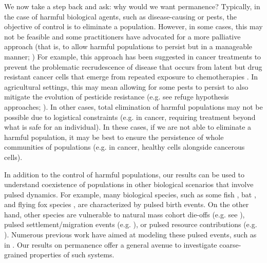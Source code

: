 \documentclass{article}
\theoremstyle{definition}
\begin{document}
We now take a step back and ask: why would we want permanence?  Typically, in the case of harmful biological agents, such as disease-causing or pests, the objective of control is to eliminate a population. However, in some cases, this may not be feasible and some practitioners have advocated for a more palliative approach (that is, to allow harmful populations to persist but in a manageable manner; \cite{gatenby_cost_of_resistance_2009, whelan2020resistance})  For example, this approach has been suggested in cancer treatments to prevent the problematic recrudescence of disease that occurs from latent but drug resistant cancer cells that emerge from repeated exposure to chemotherapies \cite{gatenby_cost_of_resistance_2009}.  In agricultural settings, this may mean allowing for some pests to persist to also mitigate the evolution of pesticide resistance (e.g. see refuge hypothesis approaches; \cite{carriere2012large}).  In other cases, total elimination of harmful populations may not be possible due to logistical constraints (e.g. in cancer, requiring treatment beyond what is safe for an individual).  In these cases, if we are not able to eliminate a harmful population, it may be best to ensure the persistence of whole communities of populations (e.g. in cancer, healthy cells alongside cancerous cells). 

In addition to the control of harmful populations, our results can be used to understand coexistence of populations in other biological scenarios that involve pulsed dynamics.  For example, many biological species, such as some fish \cite{tao2008dynamic}, bat \cite{lunn2024kenyan},  and flying fox species \cite{mitchell2021birth}, are characterized by pulsed birth events.   On the other hand, other species are vulnerable to natural mass cohort die-offs (e.g. see \cite{smith2011ecological}), pulsed settlement/migration events (e.g. \cite{hamman2018landscape}), or pulsed resource contributions (e.g. \cite{gandhi2025flow}).
Numerous previous work have aimed at modeling these pulsed events, such as in \cite{eskola2007mechanistic, pachepsky2008between, lewis2012spreading}. Our results on permanence offer a general avenue to investigate coarse-grained properties of such systems.

\end{document}
